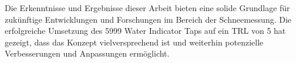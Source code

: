 Die Erkenntnisse und Ergebnisse dieser Arbeit bieten eine solide Grundlage für zukünftige Entwicklungen und Forschungen im Bereich der Schneemessung. Die erfolgreiche Umsetzung des 5999 Water Indicator Taps auf ein TRL von 5 hat gezeigt, dass das Konzept vielversprechend ist und weiterhin potenzielle Verbesserungen und Anpassungen ermöglicht.
